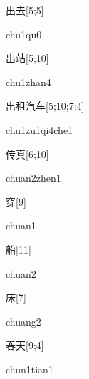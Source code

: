 \begin{verbete}[chu1qu0]{出去}[5;5]
\begin{pronuncia}{chu1qu0}
\end{pronuncia}
\end{verbete}

\begin{verbete}{出站}[5;10]
\begin{pronuncia}{chu1zhan4}
\end{pronuncia}
\end{verbete}

\begin{verbete}{出租汽车}[5;10;7;4]
\begin{pronuncia}[\\]{chu1zu1qi4che1}
\end{pronuncia}
\end{verbete}

\begin{verbete}{传真}[6;10]
\begin{pronuncia}{chuan2zhen1}
\end{pronuncia}
\end{verbete}

\begin{verbete}[chuan1]{穿}[9]
\begin{pronuncia}{chuan1}
\end{pronuncia}
\end{verbete}

\begin{verbete}[chuan2]{船}[11]
\begin{pronuncia}{chuan2}
\end{pronuncia}
\end{verbete}

\begin{verbete}[chuang2]{床}[7]
\begin{pronuncia}{chuang2}
\end{pronuncia}
\end{verbete}

\begin{verbete}{春天}[9;4]
\begin{pronuncia}{chun1tian1}
\end{pronuncia}
\end{verbete}

